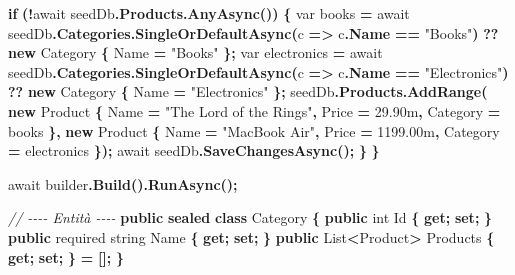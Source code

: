 \documentclass[
  italian,
  10pt,
]{book}
\newenvironment{Shaded}{\begin{snugshade}}{\end{snugshade}}
\newcommand{\CommentTok}[1]{\textcolor[rgb]{0.56,0.35,0.01}{\textit{#1}}}
\newcommand{\DataTypeTok}[1]{\textcolor[rgb]{0.13,0.29,0.53}{#1}}
\newcommand{\FloatTok}[1]{\textcolor[rgb]{0.00,0.00,0.81}{#1}}
\newcommand{\FunctionTok}[1]{\textcolor[rgb]{0.13,0.29,0.53}{\textbf{#1}}}
\newcommand{\KeywordTok}[1]{\textcolor[rgb]{0.13,0.29,0.53}{\textbf{#1}}}
\newcommand{\NormalTok}[1]{#1}
\newcommand{\OperatorTok}[1]{\textcolor[rgb]{0.81,0.36,0.00}{\textbf{#1}}}
\newcommand{\StringTok}[1]{\textcolor[rgb]{0.31,0.60,0.02}{#1}}
\begin{document}
\begin{Shaded}
\begin{Highlighting}[]
    \KeywordTok{if} \OperatorTok{(!}\NormalTok{await seedDb}\OperatorTok{.}\FunctionTok{Products}\OperatorTok{.}\FunctionTok{AnyAsync}\OperatorTok{())}
    \OperatorTok{\{}
        \DataTypeTok{var}\NormalTok{ books }\OperatorTok{=}\NormalTok{ await seedDb}\OperatorTok{.}\FunctionTok{Categories}\OperatorTok{.}\FunctionTok{SingleOrDefaultAsync}\OperatorTok{(}\NormalTok{c }\OperatorTok{=\textgreater{}}\NormalTok{ c}\OperatorTok{.}\FunctionTok{Name} \OperatorTok{==} \StringTok{"Books"}\OperatorTok{)}
            \OperatorTok{??} \KeywordTok{new}\NormalTok{ Category }\OperatorTok{\{}\NormalTok{ Name }\OperatorTok{=} \StringTok{"Books"} \OperatorTok{\};}
        \DataTypeTok{var}\NormalTok{ electronics }\OperatorTok{=}\NormalTok{ await seedDb}\OperatorTok{.}\FunctionTok{Categories}\OperatorTok{.}\FunctionTok{SingleOrDefaultAsync}\OperatorTok{(}\NormalTok{c }\OperatorTok{=\textgreater{}}\NormalTok{ c}\OperatorTok{.}\FunctionTok{Name} \OperatorTok{==} \StringTok{"Electronics"}\OperatorTok{)}
            \OperatorTok{??} \KeywordTok{new}\NormalTok{ Category }\OperatorTok{\{}\NormalTok{ Name }\OperatorTok{=} \StringTok{"Electronics"} \OperatorTok{\};}
\NormalTok{        seedDb}\OperatorTok{.}\FunctionTok{Products}\OperatorTok{.}\FunctionTok{AddRange}\OperatorTok{(}
            \KeywordTok{new}\NormalTok{ Product }\OperatorTok{\{}\NormalTok{ Name }\OperatorTok{=} \StringTok{"The Lord of the Rings"}\OperatorTok{,}\NormalTok{ Price }\OperatorTok{=} \FloatTok{29.90m}\OperatorTok{,}\NormalTok{ Category }\OperatorTok{=}\NormalTok{ books }\OperatorTok{\},}
            \KeywordTok{new}\NormalTok{ Product }\OperatorTok{\{}\NormalTok{ Name }\OperatorTok{=} \StringTok{"MacBook Air"}\OperatorTok{,}\NormalTok{ Price }\OperatorTok{=} \FloatTok{1199.00m}\OperatorTok{,}\NormalTok{ Category }\OperatorTok{=}\NormalTok{ electronics }\OperatorTok{\});}
\NormalTok{        await seedDb}\OperatorTok{.}\FunctionTok{SaveChangesAsync}\OperatorTok{();}
    \OperatorTok{\}}
\OperatorTok{\}}

\NormalTok{await builder}\OperatorTok{.}\FunctionTok{Build}\OperatorTok{().}\FunctionTok{RunAsync}\OperatorTok{();}

\CommentTok{// {-}{-}{-}{-} Entità {-}{-}{-}{-}}
\KeywordTok{public} \KeywordTok{sealed} \KeywordTok{class}\NormalTok{ Category}
\OperatorTok{\{}
    \KeywordTok{public} \DataTypeTok{int}\NormalTok{ Id }\OperatorTok{\{} \KeywordTok{get}\OperatorTok{;} \KeywordTok{set}\OperatorTok{;} \OperatorTok{\}}
    \KeywordTok{public}\NormalTok{ required }\DataTypeTok{string}\NormalTok{ Name }\OperatorTok{\{} \KeywordTok{get}\OperatorTok{;} \KeywordTok{set}\OperatorTok{;} \OperatorTok{\}}
    \KeywordTok{public}\NormalTok{ List}\OperatorTok{\textless{}}\NormalTok{Product}\OperatorTok{\textgreater{}}\NormalTok{ Products }\OperatorTok{\{} \KeywordTok{get}\OperatorTok{;} \KeywordTok{set}\OperatorTok{;} \OperatorTok{\}} \OperatorTok{=} \OperatorTok{[];}
\OperatorTok{\}}


\end{Highlighting}
\end{Shaded}
\end{document}
